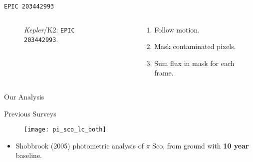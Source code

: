 \documentclass[10pt]{beamer}
\begin{document}
	\begin{frame}{\tt EPIC 203442993}
		\begin{columns}[T,onlytextwidth]
			\begin{column}{0.5\textwidth}
				\begin{figure}
					\centering
						\begin{minipage}[c][\textwidth][c]{\textwidth}
						\end{minipage}
					\caption{\textit{Kepler}/K2: \texttt{EPIC 203442993}.}
				\end{figure}
			\end{column}

			\begin{column}{0.5\textwidth}
				\begin{minipage}[c][.6\textheight][c]{\linewidth}
					\begin{enumerate}
						\item Follow motion.
						\item Mask contaminated pixels.
						\item Sum flux in mask for each frame.
					\end{enumerate}
				\end{minipage}
			\end{column}
		\end{columns}
	\end{frame}

	\begin{frame}{Our Analysis}
		\begin{figure}
			\centering
		\end{figure}
	\end{frame}

	\begin{frame}{Previous Surveys}
		\begin{overlayarea}{\textwidth}{.75\textheight}
			\begin{figure}
				\centering
					\texttt{[image: pi\_sco\_lc\_both]}
			\end{figure}
		\end{overlayarea}

		\begin{itemize}
			\item Shobbrook (2005) photometric analysis of $\pi$ Sco, from ground with \textbf{10 year} baseline.
		\end{itemize}
	\end{frame}
\end{document}

